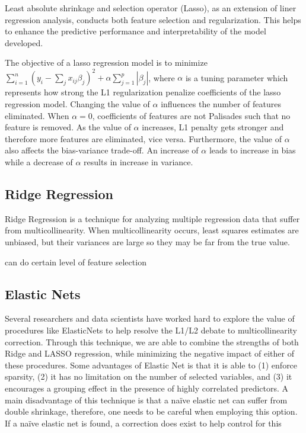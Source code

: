 \documentclass[letterpaper,12pt,twoside,]{pinp}
\begin{document}
Least absolute shrinkage and selection operator (Lasso), as an extension
of liner regression analysis, conducts both feature selection and
regularization. This helps to enhance the predictive performance and
interpretability of the model developed.

The objective of a lasso regression model is to minimize
\(\sum^n_{i=1}(y_i-\sum_jx_{ij}\beta_j)^2+\alpha\sum^p_{j=1}|\beta_j|\),
where \(\alpha\) is a tuning parameter which represents how strong the
L1 regularization penalize coefficients of the lasso regression model.
Changing the value of \(\alpha\) influences the number of features
eliminated. When \(\alpha=0\), coefficients of features are not
Palisades such that no feature is removed. As the value of \(\alpha\)
increases, L1 penalty gets stronger and therefore more features are
eliminated, vice versa. Furthermore, the value of \(\alpha\) also
affects the bias-variance trade-off. An increase of \(\alpha\) leads to
increase in bias while a decrease of \(\alpha\) results in increase in
variance.

\hypertarget{ridge-regression}{%
\subsection{Ridge Regression}\label{ridge-regression}}

Ridge Regression is a technique for analyzing multiple regression data
that suffer from multicollinearity. When multicollinearity occurs, least
squares estimates are unbiased, but their variances are large so they
may be far from the true value.

can do certain level of feature selection

\hypertarget{elastic-nets}{%
\subsection{Elastic Nets}\label{elastic-nets}}

Several researchers and data scientists have worked hard to explore the
value of procedures like ElasticNets to help resolve the L1/L2 debate to
multicollinearity correction. Through this technique, we are able to
combine the strengths of both Ridge and LASSO regression, while
minimizing the negative impact of either of these procedures. Some
advantages of Elastic Net is that it is able to (1) enforce sparsity,
(2) it has no limitation on the number of selected variables, and (3) it
encourages a grouping effect in the presence of highly correlated
predictors. A main disadvantage of this technique is that a naïve
elastic net can suffer from double shrinkage, therefore, one needs to be
careful when employing this option. If a naïve elastic net is found, a
correction does exist to help control for this
\end{document}

